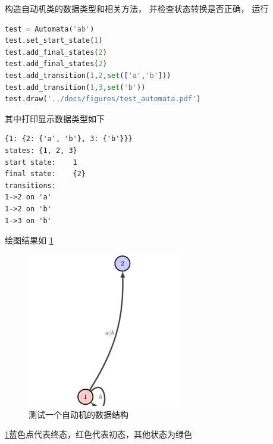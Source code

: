 \documentclass[../report]{subfiles}
\begin{document}
构造自动机类的数据类型和相关方法，
并检查状态转换是否正确，
运行
\begin{lstlisting}[language=python,numbers=none]
test = Automata('ab')
test.set_start_state(1)
test.add_final_states(2)
test.add_final_states(2)
test.add_transition(1,2,set(['a','b']))
test.add_transition(1,3,set('b'))
test.draw('../docs/figures/test_automata.pdf')
\end{lstlisting}
其中打印显示数据类型如下
\begin{lstlisting}
{1: {2: {'a', 'b'}, 3: {'b'}}}
states: {1, 2, 3}
start state:    1
final state:    {2}
transitions:
1->2 on 'a'
1->2 on 'b'
1->3 on 'b'
\end{lstlisting}

绘图结果如%
\cref{fig:testautomata}
\begin{figure}[H]
  \centering
  \includegraphics[width = 0.6\textwidth]{test_automata}
  \caption{测试一个自动机的数据结构}
  \label{fig:testautomata}
\end{figure}
\cref{fig:testautomata}蓝色点代表终态，红色代表初态，其他状态为绿色
\end{document}
